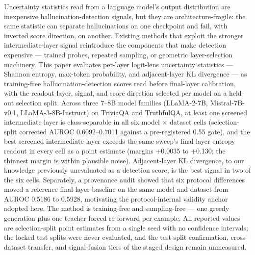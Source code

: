 
Uncertainty statistics read from a language model's output distribution are inexpensive hallucination-detection signals, but they are architecture-fragile: the same statistic can separate hallucinations on one checkpoint and fail, with inverted score direction, on another. Existing methods that exploit the stronger intermediate-layer signal reintroduce the components that make detection expensive --- trained probes, repeated sampling, or geometric layer-selection machinery. This paper evaluates per-layer logit-lens uncertainty statistics --- Shannon entropy, max-token probability, and adjacent-layer KL divergence --- as training-free hallucination-detection scores read before final-layer calibration, with the readout layer, signal, and score direction selected per model on a held-out selection split. Across three 7--8B model families (LLaMA-2-7B, Mistral-7B-v0.1, LLaMA-3-8B-Instruct) on TriviaQA and TruthfulQA, at least one screened intermediate layer is class-separable in all six model $\times$ dataset cells (selection-split corrected AUROC 0.6092--0.7011 against a pre-registered 0.55 gate), and the best screened intermediate layer exceeds the same sweep's final-layer entropy readout in every cell as a point estimate (margins +0.0035 to +0.130; the thinnest margin is within plausible noise). Adjacent-layer KL divergence, to our knowledge previously unevaluated as a detection score, is the best signal in two of the six cells. Separately, a provenance audit showed that six protocol differences moved a reference final-layer baseline on the same model and dataset from AUROC 0.5186 to 0.5928, motivating the protocol-internal validity anchor adopted here. The method is training-free and sampling-free --- one greedy generation plus one teacher-forced re-forward per example. All reported values are selection-split point estimates from a single seed with no confidence intervals; the locked test splits were never evaluated, and the test-split confirmation, cross-dataset transfer, and signal-fusion tiers of the staged design remain unmeasured.
